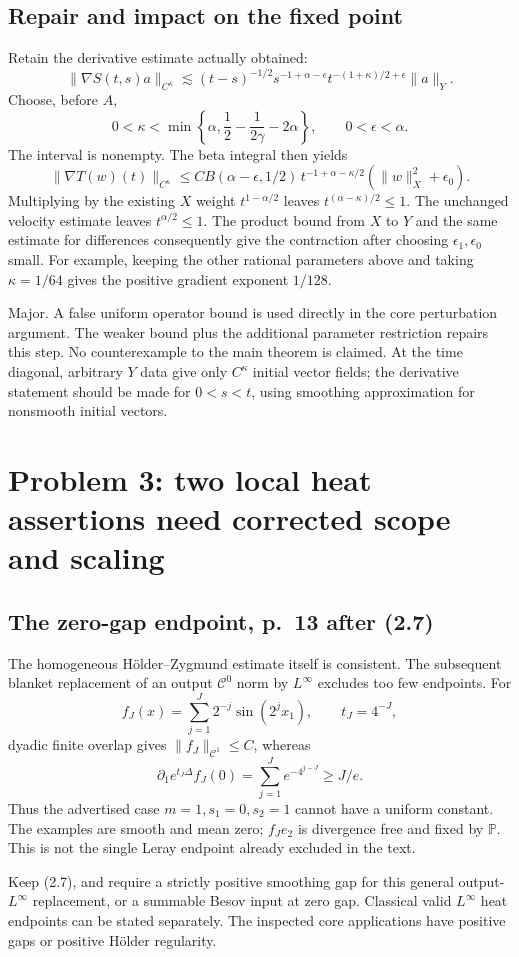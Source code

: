\documentclass[10pt]{article}
\begin{document}
\subsection*{Repair and impact on the fixed point}
Retain the derivative estimate actually obtained: \[\|\nabla S(t,s)a\|_{C^\kappa}
 \lesssim(t-s)^{-1/2}s^{-1+\alpha-\epsilon}
             t^{-(1+\kappa)/2+\epsilon}\|a\|_Y.\] Choose, before \(A\), \[0<\kappa<\min\!\left\{\alpha,\frac12-\frac1{2\gamma}-2\alpha\right\},
 \qquad 0<\epsilon<\alpha.\] The interval is nonempty. The beta integral then yields \[\|\nabla T(w)(t)\|_{C^\kappa}
 \leq C B(\alpha-\epsilon,1/2)\,
      t^{-1+\alpha-\kappa/2}(\|w\|_X^2+\epsilon_0).\] Multiplying by the existing \(X\) weight \(t^{1-\alpha/2}\) leaves \(t^{(\alpha-\kappa)/2}\leq1\). The unchanged velocity estimate leaves \(t^{\alpha/2}\leq1\). The product bound from \(X\) to \(Y\) and the same estimate for differences consequently give the contraction after choosing \(\epsilon_1,\epsilon_0\) small. For example, keeping the other rational parameters above and taking \(\kappa=1/64\) gives the positive gradient exponent \(1/128\).\par
Major. A false uniform operator bound is used directly in the core perturbation argument. The weaker bound plus the additional parameter restriction repairs this step. No counterexample to the main theorem is claimed. At the time diagonal, arbitrary \(Y\) data give only \(C^\kappa\) initial vector fields; the derivative statement should be made for \(0<s<t\), using smoothing approximation for nonsmooth initial vectors.\par
\section*{Problem 3: two local heat assertions need corrected scope and scaling}
\subsection*{The zero-gap endpoint, p. 13 after (2.7)}
The homogeneous Hölder–Zygmund estimate itself is consistent. The subsequent blanket replacement of an output \(\mathcal C^0\) norm by \(L^\infty\) excludes too few endpoints. For \[f_J(x)=\sum_{j=1}^J2^{-j}\sin(2^jx_1),\qquad t_J=4^{-J},\] dyadic finite overlap gives \(\|f_J\|_{\mathcal C^1}\leq C\), whereas \[\partial_1e^{t_J\Delta}f_J(0)
 =\sum_{j=1}^Je^{-4^{j-J}}\geq J/e.\] Thus the advertised case \(m=1,s_1=0,s_2=1\) cannot have a uniform constant. The examples are smooth and mean zero; \(f_Je_2\) is divergence free and fixed by \(\mathbb P\). This is not the single Leray endpoint already excluded in the text.\par
Keep (2.7), and require a strictly positive smoothing gap for this general output-\(L^\infty\) replacement, or a summable Besov input at zero gap. Classical valid \(L^\infty\) heat endpoints can be stated separately. The inspected core applications have positive gaps or positive Hölder regularity.\par
\end{document}
